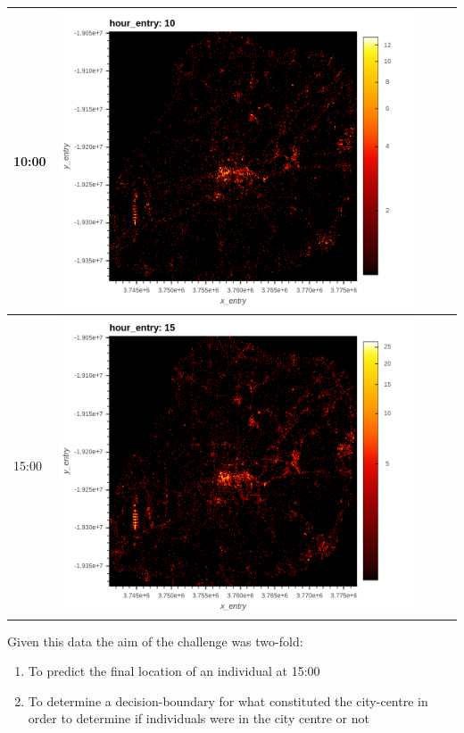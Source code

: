 \documentclass[12pt]{report}
\begin{document}
\begin{center}
\begin{tabular}{|l|l|l|l|l|}
\hline
10:00 & \includegraphics[scale=0.35]{./images/bokeh_plot_(3).png}\\
\hline
15:00 & \includegraphics[scale=0.35]{./images/bokeh_plot_(4).png}\\ 
\hline
\end{tabular}
\end{center}

Given this data the aim of the challenge was two-fold: \\
\begin{enumerate}
    \item{To predict the final location of an individual at 15:00}
    \item{To determine a decision-boundary for what constituted the city-centre in order to determine if individuals were in the city centre or not}
\end{enumerate}
\end{document}
